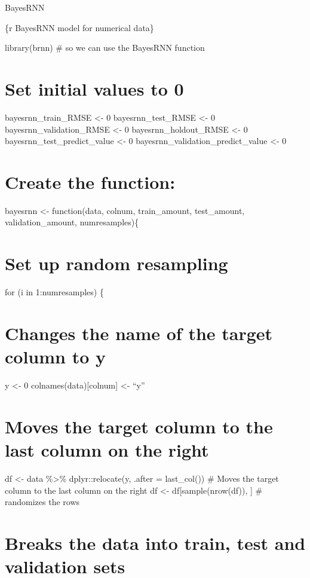 \documentclass[
]{book}
\begin{document}
BayesRNN

\{r BayesRNN model for numerical data\}

library(brnn) \# so we can use the BayesRNN function

\chapter{Set initial values to 0}\label{set-initial-values-to-0}

bayesrnn\_train\_RMSE \textless- 0 bayesrnn\_test\_RMSE \textless- 0
bayesrnn\_validation\_RMSE \textless- 0 bayesrnn\_holdout\_RMSE \textless- 0
bayesrnn\_test\_predict\_value \textless- 0 bayesrnn\_validation\_predict\_value \textless-
0

\chapter{Create the function:}\label{create-the-function}

bayesrnn \textless- function(data, colnum, train\_amount, test\_amount,
validation\_amount, numresamples)\{

\chapter{Set up random resampling}\label{set-up-random-resampling}

for (i in 1:numresamples) \{

\chapter{Changes the name of the target column to y}\label{changes-the-name-of-the-target-column-to-y}

y \textless- 0 colnames(data){[}colnum{]} \textless- ``y''

\chapter{Moves the target column to the last column on the right}\label{moves-the-target-column-to-the-last-column-on-the-right}

df \textless- data \%\textgreater\% dplyr::relocate(y, .after = last\_col()) \# Moves the
target column to the last column on the right df \textless-
df{[}sample(nrow(df)), {]} \# randomizes the rows

\chapter{Breaks the data into train, test and validation sets}\label{breaks-the-data-into-train-test-and-validation-sets}
\end{document}
